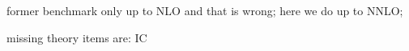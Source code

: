 former benchmark only up to NLO and that is wrong;
here we do up to NNLO;

missing theory items are: IC
